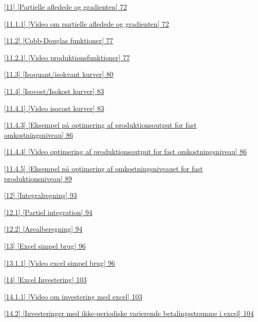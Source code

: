 \documentclass[]{book}
\begin{document}
\protect\hyperlink{partielle-afledede-og-gradienten}{{[}11{]}
{[}Partielle afledede og gradienten{]} 72}

\protect\hyperlink{video-om-partielle-afledede-og-gradienten}{{[}11.1.1{]}
{[}Video om partielle afledede og gradienten{]} 72}

\protect\hyperlink{cobb-douglas-funktioner}{{[}11.2{]} {[}Cobb-Douglas
funktioner{]} 77}

\protect\hyperlink{video-produktionsfunktioner}{{[}11.2.1{]} {[}Video
produktionsfunktioner{]} 77}

\protect\hyperlink{isoquantisokvant-kurver}{{[}11.3{]}
{[}Isoquant/isokvant kurver{]} 80}

\protect\hyperlink{isocostisokost-kurver}{{[}11.4{]} {[}Isocost/Isokost
kurver{]} 83}

\protect\hyperlink{video-isocost-kurver}{{[}11.4.1{]} {[}Video isocost
kurver{]} 83}

\protect\hyperlink{eksempel-puxe5-optimering-af-produktionsoutput-for-fast-omkostningsniveau}{{[}11.4.3{]}
{[}Eksempel på optimering af produktionsoutput for fast
omkostningsniveau{]} 86}

\protect\hyperlink{video-optimering-af-produktionsoutput-for-fast-omkostningsniveau}{{[}11.4.4{]}
{[}Video optimering af produktionsoutput for fast omkostningsniveau{]}
86}

\protect\hyperlink{eksempel-puxe5-optimering-af-omkostningsniveauet-for-fast-produktionsniveau}{{[}11.4.5{]}
{[}Eksempel på optimering af omkostningsniveauet for fast
produktionsniveau{]} 89}

\protect\hyperlink{integralregning}{{[}12{]} {[}Integralregning{]} 93}

\protect\hyperlink{partiel-integration}{{[}12.1{]} {[}Partiel
integration{]} 94}

\protect\hyperlink{arealberegning}{{[}12.2{]} {[}Arealberegning{]} 94}

\protect\hyperlink{excel-simpel-brug}{{[}13{]} {[}Excel simpel brug{]}
96}

\protect\hyperlink{video-excel-simpel-brug}{{[}13.1.1{]} {[}Video excel
simpel brug{]} 96}

\protect\hyperlink{excel-investering}{{[}14{]} {[}Excel Investering{]}
103}

\protect\hyperlink{video-om-investering-med-excel}{{[}14.1.1{]} {[}Video
om investering med excel{]} 103}

\protect\hyperlink{investeringer-med-ikke-periodiske-varierende-betalingsstruxf8mme-i-excel}{{[}14.2{]}
{[}Investeringer med ikke-periodiske varierende betalingsstrømme i
excel{]} 104}
\end{document}
